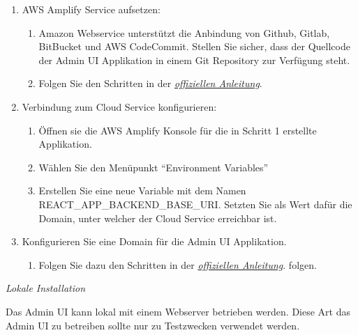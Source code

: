 \begin{enumerate}
    \item AWS Amplify Service aufsetzen:
    \begin{enumerate}
        \item Amazon Webservice unterstützt die Anbindung von Github, Gitlab, BitBucket und AWS CodeCommit. Stellen Sie sicher, dass der Quellcode der Admin UI Applikation in einem Git Repository zur Verfügung steht.
        \item Folgen Sie den Schritten in der \href{https://docs.aws.amazon.com/amplify/latest/userguide/getting-started.html}{\textit{offiziellen Anleitung}}.\cite{aws-amplify}
    \end{enumerate}
    \item Verbindung zum Cloud Service konfigurieren:
    \begin{enumerate}
        \item Öffnen sie die AWS Amplify Konsole für die in Schritt 1 erstellte Applikation.
        \item Wählen Sie den Menüpunkt ``Environment Variables''
        \item Erstellen Sie eine neue Variable mit dem Namen REACT\_APP\_BACKEND\_BASE\_URI. Setzten Sie als Wert dafür die Domain, unter welcher der Cloud Service erreichbar ist.
    \end{enumerate}
    \item Konfigurieren Sie eine Domain für die Admin UI Applikation.
    \begin{enumerate}
        \item Folgen Sie dazu den Schritten in der \href{https://docs.aws.amazon.com/amplify/latest/userguide/custom-domains.html}{\textit{offiziellen Anleitung}}.\cite{aws-amplify-domain} folgen.
    \end{enumerate}
\end{enumerate}

\textit{Lokale Installation}

Das Admin UI kann lokal mit einem Webserver betrieben werden.
Diese Art das Admin UI zu betreiben sollte nur zu Testzwecken verwendet werden.

